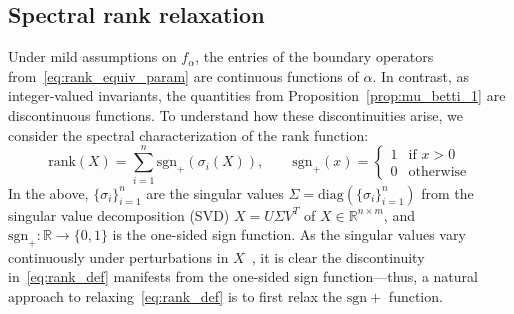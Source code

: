 \documentclass[10pt]{article}
\numberwithin{equation}{section}
\newcommand{\+}{%
	\raisebox{0.18ex}{\scaleobj{0.55}{+}}
}
\theoremstyle{definition}
\theoremstyle{definition}
\begin{document}
\subsection{Spectral rank relaxation}\label{sec:spectral_relax}
Under mild assumptions on $f_\alpha$, the entries of the boundary operators from~\eqref{eq:rank_equiv_param} are continuous functions of $\alpha$.
In contrast, as integer-valued invariants, the quantities from Proposition~\ref{prop:mu_betti_1} are discontinuous functions. To understand how these discontinuities arise, we consider the spectral characterization of the rank function:
\begin{equation}\label{eq:rank_def}
	\mathrm{rank}(X) = \sum\limits_{i=1}^{n} \mathrm{sgn}_+(\sigma_i(X)), \quad \quad \mathrm{sgn}_{+}(x) = \begin{cases}
		1 & \text{if } x > 0 \\
		0 & \text{otherwise}
	\end{cases}
\end{equation}
In the above, $\{\sigma_i \}_{i=1}^n$ are the singular values $\Sigma = \mathrm{diag}(\{\sigma_i \}_{i=1}^n)$ from the singular value decomposition (SVD) $X = U \Sigma V^T$ of $X \in \mathbb{R}^{n \times m}$, and $\mathrm{sgn}_+: \mathbb{R} \to \{0, 1\}$ is the one-sided sign function. 
 As the singular values vary continuously under perturbations in $X$~\cite{bhatia2013matrix}, it is clear the discontinuity in~\eqref{eq:rank_def} manifests from the one-sided sign function---thus, a natural approach to relaxing~\eqref{eq:rank_def} is to first relax the $\mathrm{sgn}+$ function.
\end{document}
